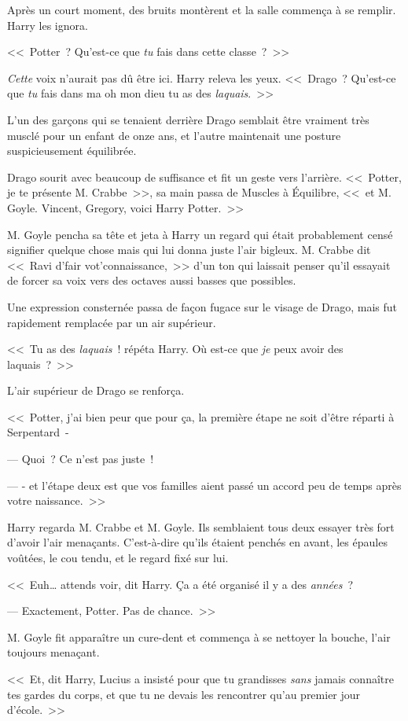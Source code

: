 Après un court moment, des bruits montèrent et la salle commença à se remplir. Harry les ignora.

<<~Potter~? Qu'est-ce que \emph{tu} fais dans cette classe~?~>>

\emph{Cette} voix n'aurait pas dû être ici. Harry releva les yeux. <<~Drago~? Qu'est-ce que \emph{tu} fais dans ma oh mon dieu tu as des \emph{laquais}.~>>

L'un des garçons qui se tenaient derrière Drago semblait être vraiment très musclé pour un enfant de onze ans, et l'autre maintenait une posture suspicieusement équilibrée.

Drago sourit avec beaucoup de suffisance et fit un geste vers l'arrière. <<~Potter, je te présente M. Crabbe~>>, sa main passa de Muscles à Équilibre, <<~et M. Goyle. Vincent, Gregory, voici Harry Potter.~>>

M. Goyle pencha sa tête et jeta à Harry un regard qui était probablement censé signifier quelque chose mais qui lui donna juste l'air bigleux. M. Crabbe dit <<~Ravi d'fair vot'connaissance,~>> d'un ton qui laissait penser qu'il essayait de forcer sa voix vers des octaves aussi basses que possibles.

Une expression consternée passa de façon fugace sur le visage de Drago, mais fut rapidement remplacée par un air supérieur.

<<~Tu as des \emph{laquais}~! répéta Harry. Où est-ce que \emph{je} peux avoir des laquais~?~>>

L'air supérieur de Drago se renforça.

<<~Potter, j'ai bien peur que pour ça, la première étape ne soit d'être réparti à Serpentard~-

--- Quoi~? Ce n'est pas juste~!

--- - et l'étape deux est que vos familles aient passé un accord peu de temps après votre naissance.~>>

Harry regarda M. Crabbe et M. Goyle. Ils semblaient tous deux essayer très fort d'avoir l'air menaçants. C'est-à-dire qu'ils étaient penchés en avant, les épaules voûtées, le cou tendu, et le regard fixé sur lui.

<<~Euh… attends voir, dit Harry. Ça a été organisé il y a des \emph{années}~?

--- Exactement, Potter. Pas de chance.~>>

M. Goyle fit apparaître un cure-dent et commença à se nettoyer la bouche, l'air toujours menaçant.

<<~Et, dit Harry, Lucius a insisté pour que tu grandisses \emph{sans} jamais connaître tes gardes du corps, et que tu ne devais les rencontrer qu'au premier jour d'école.~>>


